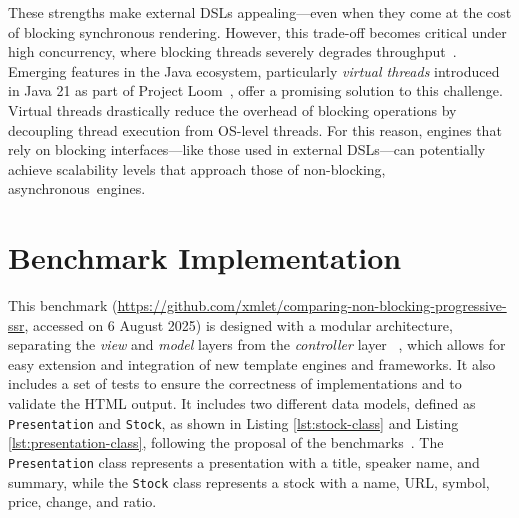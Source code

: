 \documentclass[software,article,accept,pdftex,moreauthors]{Definitions/mdpi}
\begin{document}
These strengths make external DSLs appealing---even when they come at the cost of
blocking synchronous rendering. However, this trade-off becomes critical under
high concurrency, where blocking threads severely degrades throughput~\cite{wise2024pssr}.
Emerging features in the Java ecosystem, particularly \textit{virtual threads}
introduced in Java 21 as part of Project Loom~\cite{Veen2024}, offer a promising solution to
this challenge. Virtual threads drastically reduce the overhead of blocking
operations by decoupling thread execution from OS-level threads. For this reason,
engines that rely on blocking interfaces---like those used in
external DSLs---can potentially achieve scalability levels that approach those of
non-blocking, asynchronous~engines.




\section{Benchmark Implementation}
\label{sec:bench}

This benchmark ({\url{https://github.com/xmlet/comparing-non-blocking-progressive-ssr}}, accessed on 6 August 2025)
is designed with a modular architecture, separating the \textit{view} and
\textit{model} layers from the \textit{controller} layer ~\cite{Bucanek2009},
which allows for easy extension and integration of new template engines and
frameworks. It also includes a set of tests to ensure the correctness of
implementations and to validate the HTML output. It includes two
different data models, defined as \texttt{Presentation} and \texttt{Stock}, as
shown in Listing \ref{lst:stock-class} and Listing \ref{lst:presentation-class},
following the proposal of the
benchmarks~\cite{templatesbenchmark,springbenchmark}. The \texttt{Presentation}
class represents a presentation with a title, speaker name, and summary, while
the \texttt{Stock} class represents a stock with a name, URL, symbol, price,
change, and ratio.
\end{document}
